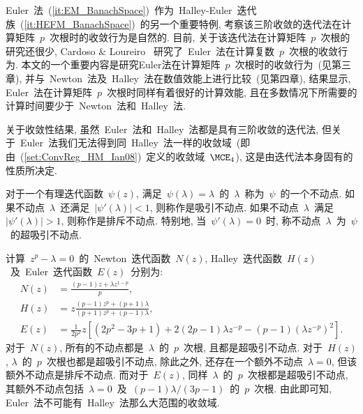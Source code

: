 Euler~法~(\ref{it:EM_BanachSpace})~作为~Halley-Euler~迭代族~(\ref{it:HEFM_BanachSpace})~的另一个重要特例,
考察该三阶收敛的迭代法在计算矩阵~$p$~次根时的收敛行为是自然的. 目前,
关于该迭代法在计算矩阵~$p$~次根的研究还很少, Cardoso $\&$ Loureiro
\cite{Cardoso2011,Cardoso2011a}~研究了~Euler~法在计算复数~$p$~次根的收敛行为.
本文的一个重要内容是研究Euler法在计算矩阵~$p$~次根时的收敛行为~(见第三章),
并与~Newton~法及~Halley~法在数值效能上进行比较~(见第四章), 结果显示,
Euler~法在计算矩阵~$p$~次根时同样有着很好的计算效能,
且在多数情况下所需要的计算时间要少于~Newton~法和~Halley~法.


关于收敛性结果, 虽然~Euler~法和~Halley~法都是具有三阶收敛的迭代法,
但关于~Euler~法我们无法得到同~Halley~法一样的收敛域~(即由~(\ref{set:ConvReg_HM_Ian08})~定义的收敛域~$\MCE_4$),
这是由迭代法本身固有的性质所决定.

对于一个有理迭代函数~$\psi(z)$,
满足~$\psi(\lambda)=\lambda$~的~$\lambda$~称为~$\psi$~的一个不动点.
如果不动点~$\lambda$~还满足~$|\psi'(\lambda)| < 1$,
则称作是吸引不动点. 如果不动点~$\lambda$~满足~$|\psi'(\lambda)| >
1$, 则称作是排斥不动点. 特别地, 当~$\psi'(\lambda)=0$~时,
称不动点~$\lambda$~为~$\psi$~的超吸引不动点.

计算~$z^p - \lambda = 0$~的~Newton~迭代函数~$N(z)$,
Halley~迭代函数~$H(z)$~及~Euler~迭代函数~$E(z)$~分别为:
\begin{align*}
N(z) & = \frac{(p-1)z+\lambda z^{1-p}}{p}, \\
H(z) & = z \frac{(p-1)z^p + (p+1)\lambda}{(p+1)z^p + (p-1)\lambda},
\\
E(z) & = \frac{1}{2p^2} z \left[(2 p^2 - 3 p + 1) + 2(2 p -
1)\lambda z^{-p} - (p - 1)\left( \lambda z^{-p}\right)^2\right].
\end{align*}
对于~$N(z)$, 所有的不动点都是~$\lambda$~的~$p$~次根,
且都是超吸引不动点. 对于~$H(z)$,
$\lambda$~的~$p$~次根也都是超吸引不动点, 除此之外,
还存在一个额外不动点~$\lambda = 0$, 但该额外不动点是排斥不动点.
而对于~$E(z)$, 同样~$\lambda$~的~$p$~次根都是超吸引不动点,
其额外不动点包括~$\lambda = 0$~及~$(p-1)\lambda/(3p-1)$~的~$p$~次根.
由此即可知, Euler~法不可能有~Halley~法那么大范围的收敛域.


%
%







